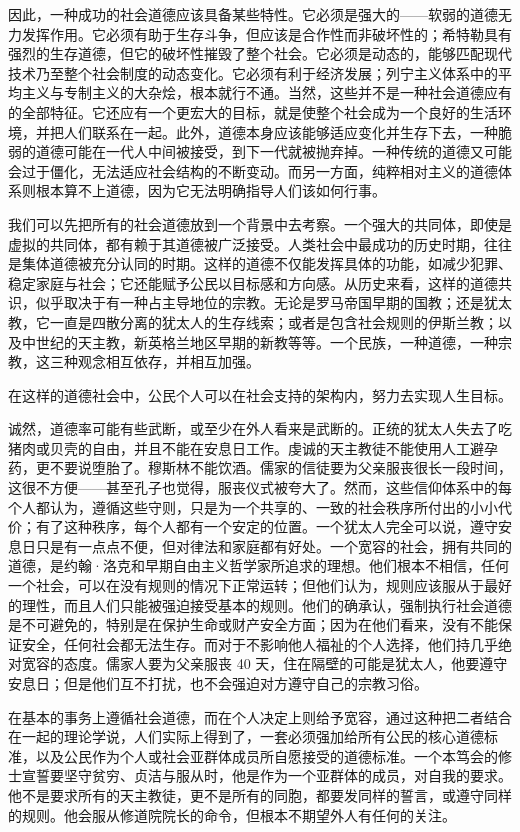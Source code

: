 因此，一种成功的社会道德应该具备某些特性。它必须是强大的——软弱的道德无力发挥作用。它必须有助于生存斗争，但应该是合作性而非破坏性的；希特勒具有强烈的生存道德，但它的破坏性摧毁了整个社会。它必须是动态的，能够匹配现代技术乃至整个社会制度的动态变化。它必须有利于经济发展；列宁主义体系中的平均主义与专制主义的大杂烩，根本就行不通。当然，这些并不是一种社会道德应有的全部特征。它还应有一个更宏大的目标，就是使整个社会成为一个良好的生活环境，并把人们联系在一起。此外，道德本身应该能够适应变化并生存下去，一种脆弱的道德可能在一代人中间被接受，到下一代就被抛弃掉。一种传统的道德又可能会过于僵化，无法适应社会结构的不断变动。而另一方面，纯粹相对主义的道德体系则根本算不上道德，因为它无法明确指导人们该如何行事。

我们可以先把所有的社会道德放到一个背景中去考察。一个强大的共同体，即使是虚拟的共同体，都有赖于其道德被广泛接受。人类社会中最成功的历史时期，往往是集体道德被充分认同的时期。这样的道德不仅能发挥具体的功能，如减少犯罪、稳定家庭与社会；它还能赋予公民以目标感和方向感。从历史来看，这样的道德共识，似乎取决于有一种占主导地位的宗教。无论是罗马帝国早期的国教；还是犹太教，它一直是四散分离的犹太人的生存线索；或者是包含社会规则的伊斯兰教；以及中世纪的天主教，新英格兰地区早期的新教等等。一个民族，一种道德，一种宗教，这三种观念相互依存，并相互加强。

在这样的道德社会中，公民个人可以在社会支持的架构内，努力去实现人生目标。

诚然，道德率可能有些武断，或至少在外人看来是武断的。正统的犹太人失去了吃猪肉或贝壳的自由，并且不能在安息日工作。虔诚的天主教徒不能使用人工避孕药，更不要说堕胎了。穆斯林不能饮酒。儒家的信徒要为父亲服丧很长一段时间，这很不方便——甚至孔子也觉得，服丧仪式被夸大了。然而，这些信仰体系中的每个人都认为，遵循这些守则，只是为一个共享的、一致的社会秩序所付出的小小代价；有了这种秩序，每个人都有一个安定的位置。一个犹太人完全可以说，遵守安息日只是有一点点不便，但对律法和家庭都有好处。一个宽容的社会，拥有共同的道德，是约翰·洛克和早期自由主义哲学家所追求的理想。他们根本不相信，任何一个社会，可以在没有规则的情况下正常运转；但他们认为，规则应该服从于最好的理性，而且人们只能被强迫接受基本的规则。他们的确承认，强制执行社会道德是不可避免的，特别是在保护生命或财产安全方面；因为在他们看来，没有不能保证安全，任何社会都无法生存。而对于不影响他人福祉的个人选择，他们持几乎绝对宽容的态度。儒家人要为父亲服丧 40 天，住在隔壁的可能是犹太人，他要遵守安息日；但是他们互不打扰，也不会强迫对方遵守自己的宗教习俗。

在基本的事务上遵循社会道德，而在个人决定上则给予宽容，通过这种把二者结合在一起的理论学说，人们实际上得到了，一套必须强加给所有公民的核心道德标准，以及公民作为个人或社会亚群体成员所自愿接受的道德标准。一个本笃会的修士宣誓要坚守贫穷、贞洁与服从时，他是作为一个亚群体的成员，对自我的要求。他不是要求所有的天主教徒，更不是所有的同胞，都要发同样的誓言，或遵守同样的规则。他会服从修道院院长的命令，但根本不期望外人有任何的关注。

